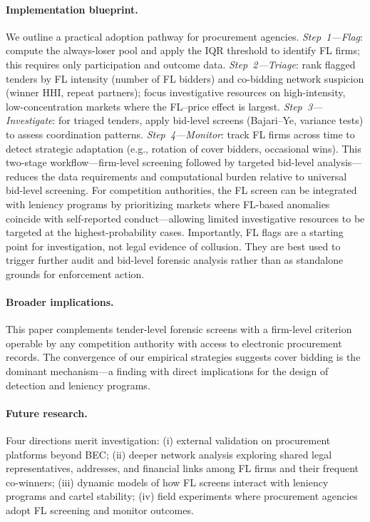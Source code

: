 \paragraph{Implementation blueprint.}
We outline a practical adoption pathway for procurement agencies.
\emph{Step~1---Flag}: compute the always-loser pool and apply the IQR
threshold to identify FL firms; this requires only participation and
outcome data. \emph{Step~2---Triage}: rank flagged tenders by FL
intensity (number of FL bidders) and co-bidding network suspicion
(winner HHI, repeat partners); focus investigative resources on
high-intensity, low-concentration markets where the FL--price effect is
largest. \emph{Step~3---Investigate}: for triaged tenders, apply
bid-level screens (Bajari--Ye, variance tests) to assess coordination %
patterns. \emph{Step~4---Monitor}: track FL firms across time to detect
strategic adaptation (e.g., rotation of cover bidders, occasional
wins). This two-stage workflow---firm-level screening followed by
targeted bid-level analysis---reduces the data requirements and
computational burden relative to universal bid-level screening.
For competition authorities, the FL screen can be integrated with %
leniency programs by prioritizing markets where FL-based anomalies
coincide with self-reported conduct---allowing limited investigative
resources to be targeted at the highest-probability cases. Importantly,
FL flags are a starting point for investigation, not legal evidence of
collusion. They are best used to trigger further audit and bid-level
forensic analysis rather than as standalone grounds for enforcement
action.

\paragraph{Broader implications.} %
This paper complements tender-level forensic screens with a firm-level
criterion operable by any competition authority with access to electronic
procurement records. The convergence of our empirical strategies suggests
cover bidding is the dominant mechanism---a finding with direct
implications for the design of detection and leniency programs.

\paragraph{Future research.}
Four directions merit investigation: (i) external validation on
procurement platforms beyond BEC; (ii) deeper network analysis exploring
shared legal representatives, addresses, and financial links among FL
firms and their frequent co-winners; (iii) dynamic models of how FL
screens interact with leniency programs and cartel stability; (iv)
field experiments where procurement agencies adopt FL screening and
monitor outcomes.
